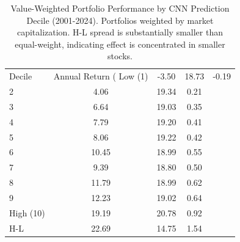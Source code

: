 \begin{table}
\caption{Value-Weighted Portfolio Performance by CNN Prediction Decile (2001-2024). Portfolios weighted by market capitalization. H-L spread is substantially smaller than equal-weight, indicating effect is concentrated in smaller stocks.}
\label{tab:portfolio_vw}
\begin{tabular}{lccc}
\toprule
Decile & Annual Return (%
\midrule
Low (1) & -3.50 & 18.73 & -0.19 \\
2 & 4.06 & 19.34 & 0.21 \\
3 & 6.64 & 19.03 & 0.35 \\
4 & 7.79 & 19.20 & 0.41 \\
5 & 8.06 & 19.22 & 0.42 \\
6 & 10.45 & 18.99 & 0.55 \\
7 & 9.39 & 18.80 & 0.50 \\
8 & 11.79 & 18.99 & 0.62 \\
9 & 12.23 & 19.02 & 0.64 \\
High (10) & 19.19 & 20.78 & 0.92 \\
H-L & 22.69 & 14.75 & 1.54 \\
\bottomrule
\end{tabular}
\end{table}

